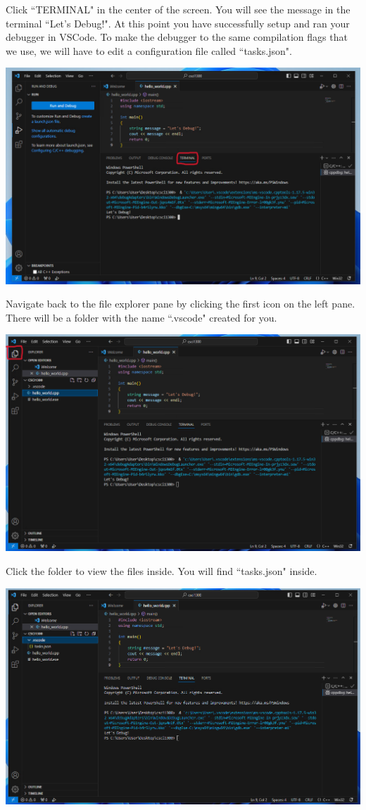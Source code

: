 Click ``TERMINAL" in the center of the screen. You will see the message in the terminal ``Let's Debug!". At this point you have successfully setup and ran your debugger in VSCode. To make the debugger to the same compilation flags that we use, we will have to edit a configuration file called ``tasks.json". 

\includegraphics[width=\textwidth]{images/windowsDebuggerSetup/debugger_windows_8.png}

Navigate back to the file explorer pane by clicking the first icon on the left pane. There will be a folder with the name ``.vscode" created for you. 

\includegraphics[width=\textwidth]{images/windowsDebuggerSetup/debugger_windows_9.png}

Click the folder to view the files inside. You will find ``tasks.json" inside. 

\includegraphics[width=\textwidth]{images/windowsDebuggerSetup/debugger_windows_10.png}

